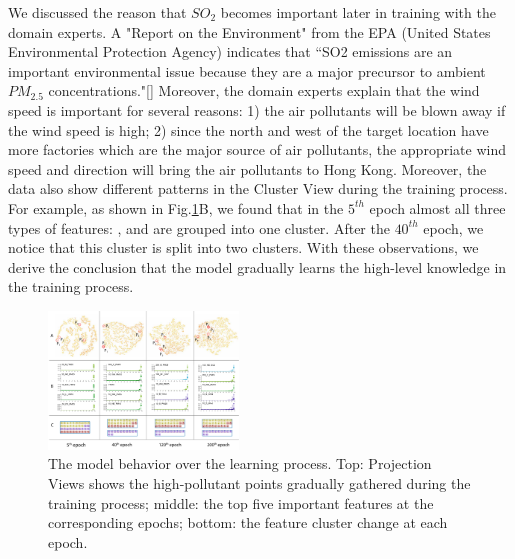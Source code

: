 We discussed the reason that $SO_2$ becomes important later in training with the domain experts. 
A "Report on the Environment" from the EPA (United States Environmental Protection Agency) indicates that ``SO2 emissions are an important environmental issue because they are a major precursor to ambient $PM_{2.5}$ concentrations."\ref{}
Moreover, the domain experts explain that the wind speed is important for several reasons: 1) the air pollutants will  be blown away if the wind speed is high; 2) since the north and west of the target location have more factories which are the major source of air pollutants, the appropriate wind speed and direction will bring the air pollutants to Hong Kong.
Moreover, the data also show different patterns in the Cluster View during the training process. 
For example, as shown in Fig.\ref{fig:evolution_epochs}B, we found that in the $5^{th}$ epoch almost all three types of features: \textit{\color{SLPColor}{Sealevel Pressure}}, \textit{\color{DPColor}{Dew-point}} and  \textit{\color{SPColor}{Station Pressure}} are grouped into one cluster. 
After the $40^{th}$ epoch, we notice that this cluster is split into two clusters.
With these observations, we derive the conclusion that the model gradually learns the high-level knowledge in the training process.

\begin{figure}[t]
	\centering
	\includegraphics[width=0.45\textwidth]{pictures/Evaluation/evolution_epochs.pdf}
	\vspace{-3mm}
	\caption{The model behavior over the learning process. Top: Projection Views shows the high-pollutant points gradually gathered during the training process; middle: the top five important features at the corresponding epochs; bottom: the feature cluster change at each epoch.}
	\label{fig:evolution_epochs}
	\vspace{-4mm}
\end{figure}


